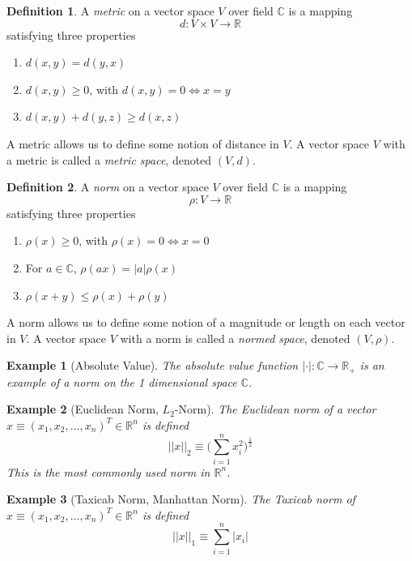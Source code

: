 \documentclass{article}
\newtheorem{example}{Example}[section]
\theoremstyle{remark}
\theoremstyle{definition}
\newtheorem{definition}{Definition}[section]
\begin{document}
\begin{definition}
A \textit{metric} on a vector space $V$ over field $\mathbb{C}$ is a mapping
\[d: V \times V \longrightarrow \mathbb{R} \]
satisfying three properties 
\begin{enumerate}
    \item $d(x, y) = d(y, x)$
    \item $d(x, y) \geq 0$, with $d(x,y) = 0 \iff x=y$
    \item $d(x, y) + d(y,z) \geq d(x,z)$
\end{enumerate}
A metric allows us to define some notion of distance in $V$. A vector space $V$ with a metric is called a \textit{metric space}, denoted $(V, d)$. 
\end{definition}

\begin{definition}
A \textit{norm} on a vector space $V$ over field $\mathbb{C}$ is a mapping 
\[\rho: V \longrightarrow \mathbb{R}\]
satisfying three properties 
\begin{enumerate}
    \item $\rho (x) \geq 0$, with $\rho(x) = 0 \iff x = 0$
    \item For $a \in \mathbb{C}$, $\rho (a x) = |a| \rho(x)$ 
    \item $\rho(x + y) \leq \rho(x) + \rho(y)$ 
\end{enumerate}
A norm allows us to define some notion of a magnitude or length on each vector in $V$. A vector space $V$ with a norm is called a \textit{normed space}, denoted $(V, \rho)$. 
\end{definition}

\begin{example}[Absolute Value]
The absolute value function $|\cdot|: \mathbb{C} \longrightarrow \mathbb{R}_+$ is an example of a norm on the 1 dimensional space $\mathbb{C}$. 
\end{example}

\begin{example}[Euclidean Norm, $L_2$-Norm]
The Euclidean norm of a vector $x \equiv (x_1, x_2, ..., x_n)^T \in \mathbb{R}^n$ is defined
\[ ||x||_2 \equiv \bigg( \sum_{i=1}^n x_i^2 \bigg)^{\frac{1}{2}}\]
This is the most commonly used norm in $\mathbb{R}^n$. 
\end{example}

\begin{example}[Taxicab Norm, Manhattan Norm]
The Taxicab norm of $x \equiv (x_1, x_2, ..., x_n)^T \in \mathbb{R}^n$ is defined
\[ ||x||_1 \equiv \sum_{i=1}^n |x_i|\]
\end{example}
\end{document}
